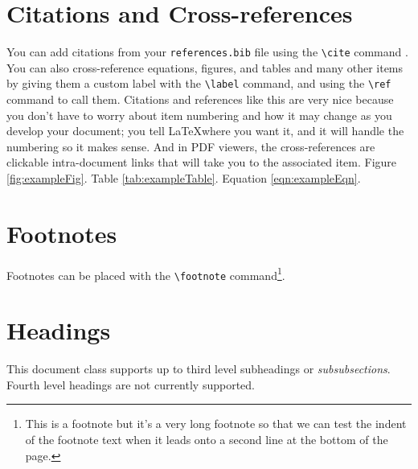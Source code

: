 \section*{Citations and Cross-references}
You can add citations from your \texttt{references.bib} file using the \texttt{\textbackslash cite} command \cite{customBibLabel}. You can also cross-reference equations, figures, and tables and many other items by giving them a custom label with the \texttt{\textbackslash label} command, and using the  \texttt{\textbackslash ref} command to call them. Citations and references like this are very nice because you don't have to worry about item numbering and how it may change as you develop your document; you tell \LaTeX where you want it, and it will handle the numbering so it makes sense. And in PDF viewers, the cross-references are clickable intra-document links that will take you to the associated item. Figure \ref{fig:exampleFig}. Table \ref{tab:exampleTable}. Equation \ref{eqn:exampleEqn}.

\section*{Footnotes}
Footnotes can be placed with the \texttt{\textbackslash footnote} command\footnote{This is a footnote but it's a very long footnote so that we can test the indent of the footnote text when it leads onto a second line at the bottom of the page.}. 

\section*{Headings}
This document class supports up to third level subheadings or \emph{subsubsections}. Fourth level headings are not currently supported.